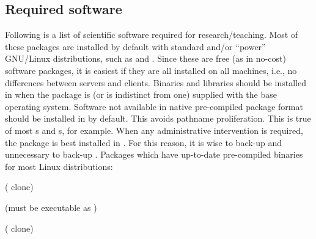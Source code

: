\documentclass[12pt,twoside]{article}
\begin{document}
\clearpage
\subsection{Required software}\label{sxn:tch2}
Following is a list of scientific software required for
research/teaching. 
Most of these packages are installed by default with standard and/or
``power'' GNU/Linux distributions, such as  and
. 
Since these are free (as in no-cost) software packages, it is 
easiest if they are all installed on all machines, i.e., no
differences between servers and clients.
Binaries and libraries should be installed in  when
the package is (or is indistinct from one) supplied with the base
operating system. 
Software not available in native pre-compiled package format should
be installed in  by default. 
This avoids pathname proliferation.   
This is true of most s and s, for example.
When any administrative intervention is required, the package is best
installed in .
For this reason, it is wise to back-up  and
unnecessary to back-up .
Packages which have up-to-date pre-compiled binaries for most
Linux distributions:
\begin{enumerate*}
\item {} 
\item {} 
\item {} 
\item {} 
\item {} 
\item {} 
\item {} 
\item {} 
\item {}
\item {} 
\item {}
\item {}
\item {}
\item {} 
\item {}
\item {}
\item {} 
\item {}
\item {} 
\item {} 
\item {} 
\item {} ( clone)
\item {} (must be executable as )
\item {} ( clone) 
\item {}
\item {}
\item {} 
\item {}
\item {}
\end{enumerate*} 
\end{document}
